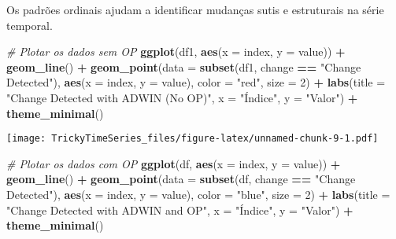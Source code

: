 \documentclass[
]{article}
\newenvironment{Shaded}{\begin{snugshade}}{\end{snugshade}}
\newcommand{\AttributeTok}[1]{\textcolor[rgb]{0.13,0.29,0.53}{#1}}
\newcommand{\CommentTok}[1]{\textcolor[rgb]{0.56,0.35,0.01}{\textit{#1}}}
\newcommand{\DecValTok}[1]{\textcolor[rgb]{0.00,0.00,0.81}{#1}}
\newcommand{\FunctionTok}[1]{\textcolor[rgb]{0.13,0.29,0.53}{\textbf{#1}}}
\newcommand{\NormalTok}[1]{#1}
\newcommand{\SpecialCharTok}[1]{\textcolor[rgb]{0.81,0.36,0.00}{\textbf{#1}}}
\newcommand{\StringTok}[1]{\textcolor[rgb]{0.31,0.60,0.02}{#1}}
\begin{document}
Os padrões ordinais ajudam a identificar mudanças sutis e estruturais na
série temporal.

\begin{Shaded}
\begin{Highlighting}[]
\CommentTok{\# Plotar os dados sem OP}
\FunctionTok{ggplot}\NormalTok{(df1, }\FunctionTok{aes}\NormalTok{(}\AttributeTok{x =}\NormalTok{ index, }\AttributeTok{y =}\NormalTok{ value)) }\SpecialCharTok{+}
  \FunctionTok{geom\_line}\NormalTok{() }\SpecialCharTok{+}
  \FunctionTok{geom\_point}\NormalTok{(}\AttributeTok{data =} \FunctionTok{subset}\NormalTok{(df1, change }\SpecialCharTok{==} \StringTok{"Change Detected"}\NormalTok{), }\FunctionTok{aes}\NormalTok{(}\AttributeTok{x =}\NormalTok{ index, }\AttributeTok{y =}\NormalTok{ value), }\AttributeTok{color =} \StringTok{"red"}\NormalTok{, }\AttributeTok{size =} \DecValTok{2}\NormalTok{) }\SpecialCharTok{+}
  \FunctionTok{labs}\NormalTok{(}\AttributeTok{title =} \StringTok{"Change Detected with ADWIN (No OP)"}\NormalTok{, }\AttributeTok{x =} \StringTok{"Índice"}\NormalTok{, }\AttributeTok{y =} \StringTok{"Valor"}\NormalTok{) }\SpecialCharTok{+}
  \FunctionTok{theme\_minimal}\NormalTok{()}
\end{Highlighting}
\end{Shaded}

\texttt{[image: TrickyTimeSeries\_files/figure-latex/unnamed-chunk-9-1.pdf]}

\begin{Shaded}
\begin{Highlighting}[]
\CommentTok{\# Plotar os dados com OP}
\FunctionTok{ggplot}\NormalTok{(df, }\FunctionTok{aes}\NormalTok{(}\AttributeTok{x =}\NormalTok{ index, }\AttributeTok{y =}\NormalTok{ value)) }\SpecialCharTok{+}
  \FunctionTok{geom\_line}\NormalTok{() }\SpecialCharTok{+}
  \FunctionTok{geom\_point}\NormalTok{(}\AttributeTok{data =} \FunctionTok{subset}\NormalTok{(df, change }\SpecialCharTok{==} \StringTok{"Change Detected"}\NormalTok{), }\FunctionTok{aes}\NormalTok{(}\AttributeTok{x =}\NormalTok{ index, }\AttributeTok{y =}\NormalTok{ value), }\AttributeTok{color =} \StringTok{"blue"}\NormalTok{, }\AttributeTok{size =} \DecValTok{2}\NormalTok{) }\SpecialCharTok{+}
  \FunctionTok{labs}\NormalTok{(}\AttributeTok{title =} \StringTok{"Change Detected with ADWIN and OP"}\NormalTok{, }\AttributeTok{x =} \StringTok{"Índice"}\NormalTok{, }\AttributeTok{y =} \StringTok{"Valor"}\NormalTok{) }\SpecialCharTok{+}
  \FunctionTok{theme\_minimal}\NormalTok{()}
\end{Highlighting}
\end{Shaded}
\end{document}
